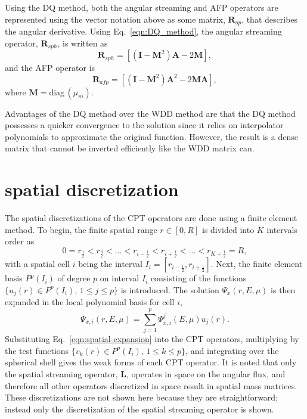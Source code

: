 \documentclass[../main.tex]{subfiles}
\begin{document}
Using the DQ method, both the angular streaming and AFP operators are represented using the vector notation above as some matrix, $\boldsymbol{R}_{op}$, that describes the angular derivative. Using Eq.~\eqref{eqn:DQ_method}, the angular streaming operator, $\boldsymbol{R}_{sph}$, is written as
\begin{equation} \label{eqn:angular_discretization_angular_streaming}
    \boldsymbol{R}_{sph} = \left[ (\boldsymbol{I} - \boldsymbol{M}^2) \boldsymbol{A} - 2 \boldsymbol{M} \right],
\end{equation}
and the AFP operator is
\begin{equation} \label{eqn:angular_discretization_afp}
    \boldsymbol{R}_{afp} = \left[ (\boldsymbol{I} - \boldsymbol{M}^2) \boldsymbol{A}^2 - 2 \boldsymbol{M} \boldsymbol{A} \right],
\end{equation}
where $\boldsymbol{M} = \text{diag} \, (\mu_m)$.

Advantages of the DQ method over the WDD method are that the DQ method possesses a quicker convergence to the solution since it relies on interpolator polynomials to approximate the original function. However, the result is a dense matrix that cannot be inverted efficiently like the WDD matrix can.

\section{\dG spatial discretization}
The spatial discretizations of the CPT operators are done using a \dG finite element method. To begin, the finite spatial range $r \in [0,R]$ is divided into $K$ intervals order as
\begin{equation}
    0 = r_{\frac{1}{2}} < r_{\frac{3}{2}} < \ldots < r_{i-\frac{1}{2}} < r_{i+\frac{1}{2}} < \ldots < r_{K+\frac{1}{2}} = R,
\end{equation}
with a spatial cell $i$ being the interval $I_i = [r_{i-\frac{1}{2}}, r_{i+\frac{1}{2}}]$. Next, the finite element basis $P^p(I_i)$ of degree $p$ on interval $I_i$ consisting of the functions $\lbrace u_j(r) \in P^p(I_i), \, 1 \leq j \leq p \rbrace$ is introduced. The solution $\Psi_x(r,E,\mu)$ is then expanded in the local polynomial basis for cell $i$,
\begin{equation} \label{eqn:spatial-expansion}
    \Psi_{x,i}(r,E,\mu) = \sum_{j=1}^p \Psi_{x,i}^j(E,\mu) u_j(r).
\end{equation}
Substituting Eq.~\eqref{eqn:spatial-expansion} into the CPT operators, multiplying by the test functions $\lbrace v_k(r) \in P^p(I_i), \, 1 \leq k \leq p \rbrace$, and integrating over the spherical shell gives the weak forms of each CPT operator. It is noted that only the spatial streaming operator, $\boldsymbol{L}$, operates in space on the angular flux, and therefore all other operators discretized in space result in spatial mass matrices. These discretizations are not shown here because they are straightforward; instead only the discretization of the spatial streaming operator is shown.
\end{document}
